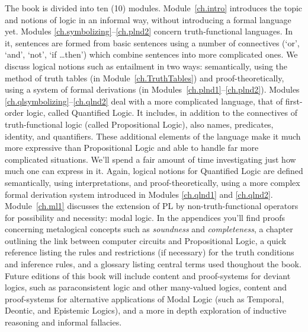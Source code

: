 The book is divided into ten (10) modules. Module~\ref{ch.intro} introduces the topic and notions of logic in an informal way, without introducing a formal language yet.  Modules \ref{ch.symbolizing}--\ref{ch.plnd2} concern truth-functional languages. In it, sentences are formed from basic sentences using a number of connectives (`or', `and', `not', `if \dots then') which combine sentences into more complicated ones.  We discuss logical notions such as entailment in two ways: semantically, using the method of truth tables (in Module~\ref{ch.TruthTables}) and proof-theoretically, using a system of formal derivations (in Modules~\ref{ch.plnd1}--\ref{ch.plnd2}).  Modules \ref{ch.qlsymbolizing}--\ref{ch.qlnd2} deal with a more complicated language, that of first-order logic, called Quantified Logic. It includes, in addition to the connectives of truth-functional logic (called Propositional Logic), also names, predicates, identity, and quantifiers. These additional elements of the language make it much more expressive than Propositional Logic and able to handle far more complicated situations. We'll spend a fair amount of time investigating just how much one can express in it.  Again, logical notions for Quantified Logic are defined semantically, using interpretations, and proof-theoretically, using a more complex formal derivation system introduced in Modules \ref{ch.qlnd1} and \ref{ch.qlnd2}.  Module~\ref{ch.ml1} discusses the extension of PL by non-truth-functional operators for possibility and necessity: modal logic. In the appendices you'll find proofs concerning metalogical concepts such as \emph{soundness} and \emph{completeness}, a chapter outlining the link between computer circuits and Propositional Logic, a quick reference listing the rules and restrictions (if necessary) for the truth conditions and inference rules, and a glossary listing central terms used thoughout the book. Future editions of this book will include content and proof-systems for deviant logics, such as paraconsistent logic and other many-valued logics, content and proof-systems for alternative applications of Modal Logic (such as Temporal, Deontic, and Epistemic Logics), and a more in depth exploration of inductive reasoning and informal fallacies. 

